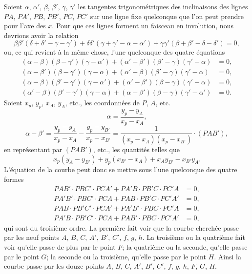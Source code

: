 \documentclass[12pt,a4paper]{article}
\begin{document}
Soient $\alpha$, $\alpha'$, $\beta$, $\beta'$, $\gamma$, $\gamma'$ les tangentes trigonom\'etriques des inclinaisons des lignes $PA$, $PA'$, $PB$, $PB'$, $PC$, $PC'$ sur une ligne fixe quelconque que l'on peut prendre pour l'axe des $x$. Pour que ces lignes forment un faisceau en involution, nous devrions avoir la relation
\[
\beta\beta'(\delta + \delta' - \gamma - \gamma') + \delta\delta'(\gamma + \gamma' - \alpha - \alpha') + \gamma\gamma'(\beta + \beta' - \delta - \delta') = 0,
\]
ou, ce qui revient \`a la m\^eme chose, l'une quelconque des quatre \'equations
\begin{align*}
(\alpha - \beta)(\beta - \gamma')(\gamma - \alpha') + (\alpha' - \beta')(\beta' - \gamma)(\gamma' - \alpha) &= 0,\\
(\alpha - \beta')(\beta - \gamma')(\gamma - \alpha) + (\alpha' - \beta)(\beta' - \gamma)(\gamma' - \alpha) &= 0,\\
(\alpha - \beta)(\beta' - \gamma')(\gamma - \alpha') + (\alpha' - \beta')(\beta - \gamma)(\gamma' - \alpha) &= 0,\\
(\alpha' - \beta)(\beta' - \gamma')(\gamma - \alpha) + (\alpha - \beta')(\beta - \gamma)(\gamma' - \alpha') &= 0.
\end{align*}
Soient $x_p$, $y_p$, $x_A$, $y_A$, etc., les coordonn\'ees de $P$, $A$, etc.
\[
\alpha = \frac{y_p - y_A}{x_p - x_A},
\]
\[
\alpha - \beta' = \frac{y_p - y_A}{x_p - x_A} - \frac{y_p - y_{B'}}{x_p - x_{B'}} = \frac{1}{(x_p - x_A)(x_p - x_{B'})}\cdot(PAB'),
\]
en repr\'esentant par $(PAB')$, etc., les quantit\'es telles que
\[
x_p(y_A - y_{B'}) + y_p(x_{B'} - x_A) + x_A y_{B'} - x_{B'} y_A.
\]
L'\'equation de la courbe peut donc se mettre sous l'une quelconque des quatre formes
\begin{align*}
PAB' \cdot PBC' \cdot PCA' + PA'B \cdot PB'C \cdot PC'A &= 0,\\
PA'B' \cdot PBC' \cdot PCA + PAB \cdot PB'C \cdot PC'A' &= 0,\\
PAB \cdot PB'C' \cdot PCA' + PA'B' \cdot PBC \cdot PC'A &= 0,\\
PA'B \cdot PB'C' \cdot PCA + PAB' \cdot PBC \cdot PC'A' &= 0,
\end{align*}
qui sont du troisi\`eme ordre. La premi\`ere fait voir que la courbe cherch\'ee passe par les neuf points $A$, $B$, $C$, $A'$, $B'$, $C'$, $f$, $g$, $h$. La troisi\`eme ou la quatri\`eme fait voir qu'elle passe de plus par le point $F$; la quatri\`eme ou la seconde, qu'elle passe par le point $G$; la seconde ou la troisi\`eme, qu'elle passe par le point $H$. Ainsi la courbe passe par les douze points $A$, $B$, $C$, $A'$, $B'$, $C'$, $f$, $g$, $h$, $F$, $G$, $H$.
\end{document}

